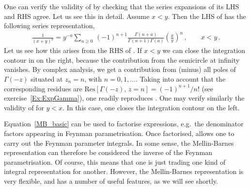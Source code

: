 One can verify the validity of  by checking that the series expansions of its LHS and RHS agree.
Let us see this in detail.
Assume $x<y$. Then the LHS of  has the following series representation,
\begin{align}\label{MB_check}
\frac{1}{(x+y)^{a}} = y^{-a} \sum_{n\ge 0} \, (-1)^{n+1} \frac{ \Gamma(n+a)}{\Gamma(n+1)\Gamma(a)} \left( \frac{x}{y} \right)^n \,,\qquad x<y\,.
\end{align}
Let us see how this arises from the RHS of . If $x<y$ we can close the integration contour in  on the right,
because the contribution from the semicircle at infinity vanishes.
By complex analysis, we get a contribution from (minus) all poles of $\Gamma(-z)$ situated at $z_{n} = n$, with $n = 0, 1, \ldots$.
Taking into account that the corresponding residues are $\text{Res}[\Gamma(-z), \, z=n]=(-1)^{n+1}/n!$ (see exercise~\ref{Ex:ExpGamma}),
one readily reproduces .
One may verify similarly the validity of  for $y<x$. In this case, one closes the integration contour on the left.

Equation~\eqref{MB_basic} can be used to factorise expressions, e.g.\ the denominator factors appearing 
in Feynman parametrisation.
Once factorised,  
allows one to carry out the Feynman parameter integrals. 
In some sense, the Mellin-Barnes representation can therefore be considered
the inverse of the Feynman parametrisation.
Of course, this means that one is just trading one kind of integral representation for another.
However, the Mellin-Barnes representation is very flexible, and has a number of useful features, as
we will see shortly.



